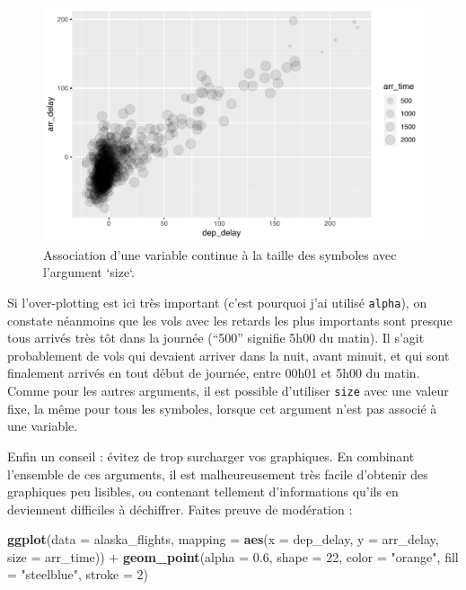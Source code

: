 \documentclass[a4paperpaper,]{article}
\newenvironment{Shaded}{\begin{snugshade}}{\end{snugshade}}
\newcommand{\DataTypeTok}[1]{\textcolor[rgb]{0.00,0.34,0.68}{#1}}
\newcommand{\DecValTok}[1]{\textcolor[rgb]{0.69,0.50,0.00}{#1}}
\newcommand{\FloatTok}[1]{\textcolor[rgb]{0.69,0.50,0.00}{#1}}
\newcommand{\KeywordTok}[1]{\textcolor[rgb]{0.12,0.11,0.11}{\textbf{#1}}}
\newcommand{\NormalTok}[1]{\textcolor[rgb]{0.12,0.11,0.11}{#1}}
\newcommand{\OperatorTok}[1]{\textcolor[rgb]{0.12,0.11,0.11}{#1}}
\newcommand{\StringTok}[1]{\textcolor[rgb]{0.75,0.01,0.01}{#1}}
\begin{document}
\begin{figure}[htpb]

{\centering \includegraphics[width=0.9\linewidth]{figure/sizeplot-1} 

}

\caption{Association d'une variable continue à la taille des symboles avec l'argument `size`.}\label{fig:sizeplot}
\end{figure}

Si l'over-plotting est ici très important (c'est pourquoi j'ai utilisé \texttt{alpha}), on constate néanmoins que les vols avec les retards les plus importants sont presque tous arrivés très tôt dans la journée (``500'' signifie 5h00 du matin). Il s'agit probablement de vols qui devaient arriver dans la nuit, avant minuit, et qui sont finalement arrivés en tout début de journée, entre 00h01 et 5h00 du matin. Comme pour les autres arguments, il est possible d'utiliser \texttt{size} avec une valeur fixe, la même pour tous les symboles, lorsque cet argument n'est pas associé à une variable.

Enfin un conseil : évitez de trop surcharger vos graphiques. En combinant l'ensemble de ces arguments, il est malheureusement très facile d'obtenir des graphiques peu lisibles, ou contenant tellement d'informations qu'ils en deviennent difficiles à déchiffrer. Faites preuve de modération :

\begin{Shaded}
\begin{Highlighting}[]
\KeywordTok{ggplot}\NormalTok{(}\DataTypeTok{data =}\NormalTok{ alaska_flights, }
       \DataTypeTok{mapping =} \KeywordTok{aes}\NormalTok{(}\DataTypeTok{x =}\NormalTok{ dep_delay, }\DataTypeTok{y =}\NormalTok{ arr_delay, }\DataTypeTok{size =}\NormalTok{ arr_time)) }\OperatorTok{+}
\StringTok{  }\KeywordTok{geom_point}\NormalTok{(}\DataTypeTok{alpha =} \FloatTok{0.6}\NormalTok{, }
             \DataTypeTok{shape =} \DecValTok{22}\NormalTok{,}
             \DataTypeTok{color =} \StringTok{"orange"}\NormalTok{,}
             \DataTypeTok{fill =} \StringTok{"steelblue"}\NormalTok{,}
             \DataTypeTok{stroke =} \DecValTok{2}\NormalTok{)}
\end{Highlighting}
\end{Shaded}
\end{document}

